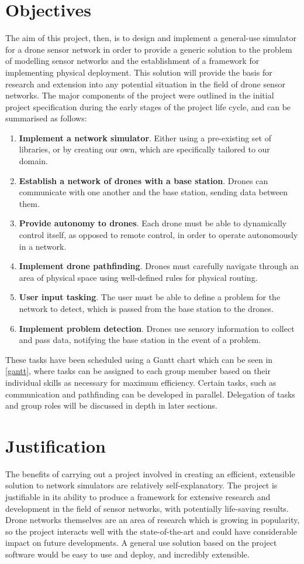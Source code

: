 \section{Objectives}
\label{sec:obj}
The aim of this project, then, is to design and implement a general-use simulator for a drone sensor network in order to provide a generic solution to the problem of modelling sensor networks and the establishment of a framework for implementing physical deployment. This solution will provide the basis for research and extension into any potential situation in the field of drone sensor networks. The major components of the project were outlined in the initial project specification during the early stages of the project life cycle, and can be summarised as follows: 
\begin{enumerate}
  \item \textbf{Implement a network simulator}. Either using a pre-existing set of libraries, or by creating our own, which are specifically tailored to our domain.
  \item \textbf{Establish a network of drones with a base station}. Drones can communicate with one another and the base station, sending data between them.
  \item \textbf{Provide autonomy to drones}. Each drone must be able to dynamically control itself, as opposed to remote control, in order to operate autonomously in a network.
\item \textbf{Implement drone pathfinding}. Drones must carefully navigate through an area of physical space using well-defined rules for physical routing.
\item \textbf{User input tasking}. The user must be able to define a problem for the network to detect, which is passed from the base station to the drones.
\item \textbf{Implement problem detection}. Drones use sensory information to collect and pass data, notifying the base station in the event of a problem.
\end{enumerate}
These tasks have been scheduled using a Gantt chart which can be seen in \ref{gantt}, where tasks can be assigned to each group member based on their individual skills as necessary for maximum efficiency. Certain tasks, such as communication and pathfinding can be developed in parallel. Delegation of tasks and group roles will be discussed in depth in later sections.

\section{Justification}
The benefits of carrying out a project involved in creating an efficient, extensible solution to network simulators are relatively self-explanatory. The project is justifiable in its ability to produce a framework for extensive research and development in the field of sensor networks, with potentially life-saving results. Drone networks themselves are an area of research which is growing in popularity, so the project interacts well with the state-of-the-art and could have considerable impact on future developments. A general use solution based on the project software would be easy to use and deploy, and incredibly extensible.

